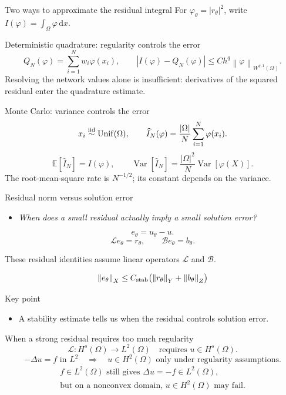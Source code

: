 \documentclass[aspectratio=43,11pt]{beamer}
\newcommand{\slideid}{L3}
\newcommand{\E}{\mathbb{E}}
\newcommand{\dd}{\,\mathrm d}
\newcommand{\Lop}{\mathcal{L}}
\newcommand{\Bop}{\mathcal{B}}
\newcommand{\norm}[1]{\left\lVert #1\right\rVert}
\DeclareMathOperator{\Var}{Var}
\newenvironment{slideitems}{\small\begin{itemize}\setlength\itemsep{0.45em}}{\end{itemize}}
\newcommand{\guidingquestion}[1]{\begin{slideitems}\item\textit{#1}\end{slideitems}}
\newcommand{\labnote}[1]{{\scriptsize\color{courseBlue}#1\par}}
\begin{document}
\renewcommand{\slideid}{L3-S020}
\begin{frame}[c]{Two ways to approximate the residual integral}
\small
For $\varphi_\theta=|r_\theta|^2$, write
$I(\varphi)=\int_\Omega\varphi\dd x$.
\begin{block}{Deterministic quadrature: regularity controls the error}
\[
Q_N(\varphi)=\sum_{i=1}^Nw_i\varphi(x_i),\qquad
|I(\varphi)-Q_N(\varphi)|\le Ch^q\norm{\varphi}_{W^{q,1}(\Omega)}.
\]
Resolving the network values alone is insufficient: derivatives of the
squared residual enter the quadrature estimate.
\end{block}
\begin{block}{Monte Carlo: variance controls the error}
\[
x_i\overset{\rm iid}{\sim}\operatorname{Unif}(\Omega),\qquad
\widehat I_N(\varphi)=\frac{|\Omega|}{N}\sum_{i=1}^N\varphi(x_i).
\]
\[
\E[\widehat I_N]=I(\varphi),\qquad
\Var[\widehat I_N]=\frac{|\Omega|^2}{N}\Var[\varphi(X)].
\]
The root-mean-square rate is $N^{-1/2}$; its constant depends on the variance.
\end{block}
\end{frame}

\renewcommand{\slideid}{L3-S023}
\begin{frame}[c]{Residual norm versus solution error}
\small
\guidingquestion{When does a small residual actually imply a small solution error?}
\[
e_\theta=u_\theta-u.
\]
\[
\Lop e_\theta=r_\theta,
\qquad \Bop e_\theta=b_\theta.
\]
\labnote{These residual identities assume linear operators $\Lop$ and $\Bop$.}
\[
\norm{e_\theta}_{X}
\le C_{\rm stab}
\bigl(\norm{r_\theta}_{Y}+\norm{b_\theta}_{Z}\bigr)
\]
\begin{block}{Key point}
\begin{slideitems}
\item A stability estimate tells us when the residual controls solution error.
\end{slideitems}
\end{block}
\end{frame}

\renewcommand{\slideid}{L3-S024}
\begin{frame}[c]{When a strong residual requires too much regularity}
\small
\[
\Lop:H^{s}(\Omega)\to L^2(\Omega)
\quad\text{requires } u\in H^{s}(\Omega).
\]
\[
-\Delta u=f \text{ in } L^2
\quad\Rightarrow\quad u\in H^2(\Omega)
\text{ only under regularity assumptions.}
\]
\[
\begin{gathered}
f\in L^2(\Omega)\text{ still gives }\Delta u=-f\in L^2(\Omega),\\
\text{but on a nonconvex domain, }u\in H^2(\Omega)\text{ may fail.}
\end{gathered}
\]
\end{frame}
\end{document}
